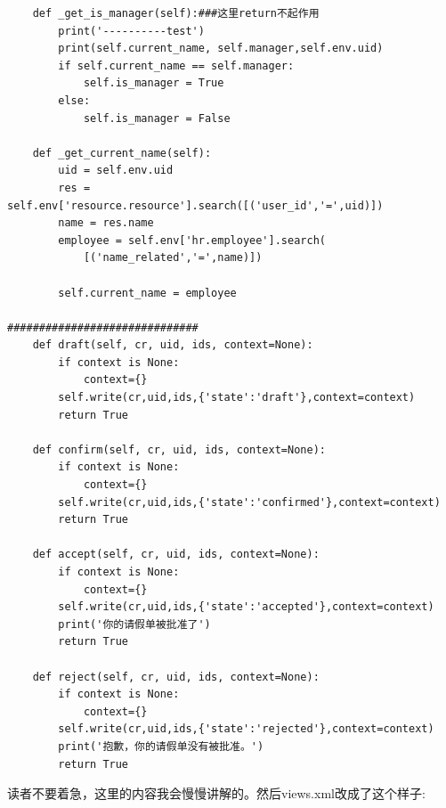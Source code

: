 \documentclass[11pt,a4paper]{sphinxmanual}
\begin{document}
\begin{verbatim}
    def _get_is_manager(self):###这里return不起作用
        print('----------test')
        print(self.current_name, self.manager,self.env.uid)
        if self.current_name == self.manager:
            self.is_manager = True
        else:
            self.is_manager = False

    def _get_current_name(self):
        uid = self.env.uid
        res = self.env['resource.resource'].search([('user_id','=',uid)])
        name = res.name
        employee = self.env['hr.employee'].search(
            [('name_related','=',name)])

        self.current_name = employee

##############################
    def draft(self, cr, uid, ids, context=None):
        if context is None:
            context={}
        self.write(cr,uid,ids,{'state':'draft'},context=context)
        return True

    def confirm(self, cr, uid, ids, context=None):
        if context is None:
            context={}
        self.write(cr,uid,ids,{'state':'confirmed'},context=context)
        return True

    def accept(self, cr, uid, ids, context=None):
        if context is None:
            context={}
        self.write(cr,uid,ids,{'state':'accepted'},context=context)
        print('你的请假单被批准了')
        return True

    def reject(self, cr, uid, ids, context=None):
        if context is None:
            context={}
        self.write(cr,uid,ids,{'state':'rejected'},context=context)
        print('抱歉，你的请假单没有被批准。')
        return True
\end{verbatim}

读者不要着急，这里的内容我会慢慢讲解的。然后views.xml改成了这个样子:
\end{document}
